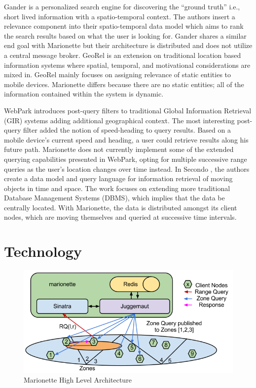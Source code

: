 \documentclass[12pt]{report}	%
\theoremstyle{definition}
\theoremstyle{remark}
\begin{document}
Gander \cite{michel2011gander} is a personalized search
engine for discovering the ``ground truth'' i.e., short lived information
with a spatio-temporal context. The authors insert a relevance component
into their spatio-temporal data model which aims to rank the search
results based on what the user is looking for. Gander shares a similar
end goal with Marionette but their architecture is distributed and does
not utilize a central message broker. GeoRel
\cite{reichenbacher2009geo} is an extension on
traditional location based information systems where spatial, temporal,
and motivational considerations are mixed in. GeoRel mainly focuses on
assigning relevance of static entities to mobile devices. Marionette
differs because there are no static entities; all of the information
contained within the system is dynamic.

WebPark \cite{mountain2007geo} introduces post-query
filters to traditional Global Information Retrieval (GIR) systems adding
additional geographical context. The most interesting post-query filter
added the notion of speed-heading to query results. Based on a mobile device's
current speed and heading, a user could retrieve results along his future
path. Marionette does not currently implement some of the extended
querying capabilities presented in WebPark, opting for multiple
successive range queries as the user's location changes over time
instead. In Secondo \cite{teixeira2006querying}, the
authors create a data model and query language for information retrieval
of moving objects in time and space. The work focuses on extending more
traditional Database Management Systems (DBMS), which implies that the
data be centrally located. With Marionette, the data is distributed
amongst its client nodes, which are moving themselves and queried at
successive time intervals.

\chapter{Technology}

\begin{figure}[h!]
\centering
\includegraphics[scale=0.6]{0.png}
\caption{Marionette High Level Architecture}
\label{hla}
\end{figure}
\end{document}

